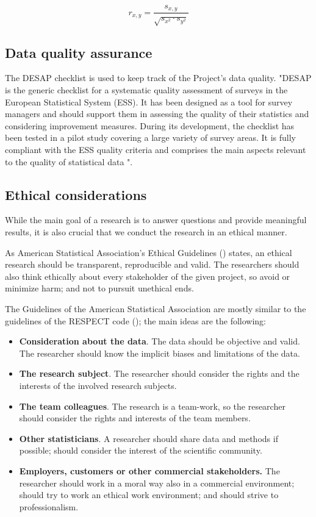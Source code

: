 \documentclass[12pt,a4paper,paper=a4,oneside,titlepage,pdftex]{scrartcl}
\begin{document}
\begin{equation}
r_{x,y} = \frac{s_{x,y}}{\sqrt{s_{x^2} \cdot s_{y^2}}}
\label{eq:correlation}
\end{equation}

\subsection{Data quality assurance}
The DESAP checklist is used to keep track of the Project's data quality. "DESAP  is  the  generic  checklist  for  a  systematic  quality  assessment  of  surveys  in  the  European Statistical  System  (ESS).  It  has  been  designed  as  a  tool  for  survey  managers  and  should  support them  in  assessing  the  quality  of  their  statistics  and  considering  improvement  measures.  During  its development, the checklist has been tested in a pilot study covering a large variety of survey areas. It is fully compliant with the ESS quality criteria and comprises the main aspects relevant to the quality of  statistical  data \cite{desap2019}".

\subsection{Ethical considerations} 
While the main goal of a research is to answer questions and provide meaningful results, it is also crucial that we conduct the research in an ethical manner. 

As American Statistical Association’s Ethical Guidelines (\cite{asa}) states, an ethical research should be transparent, reproducible and valid. The researchers should also think ethically about every stakeholder of the given project, so avoid or minimize harm; and not to pursuit unethical ends. 

The Guidelines of the American Statistical Association are mostly similar to the guidelines of the RESPECT code (\cite{respect}); the main ideas are the following:

\begin{itemize}
	\item \textbf{Consideration about the data}. The data should be objective and valid. The researcher should know the implicit biases and limitations of the data.
	\item \textbf{The research subject}. The researcher should consider the rights and the interests of the involved research subjects.
	\item \textbf{The team colleagues}. The research is a team-work, so the researcher should consider the rights and interests of the team members.
	\item \textbf{Other statisticians}. A researcher should share data and methods if possible; should consider the interest of the scientific community.
	\item \textbf{Employers, customers or other commercial stakeholders.} The researcher should work in a moral way also in a commercial environment; should try to work an ethical work environment; and should strive to professionalism.
\end{itemize}
\end{document}
